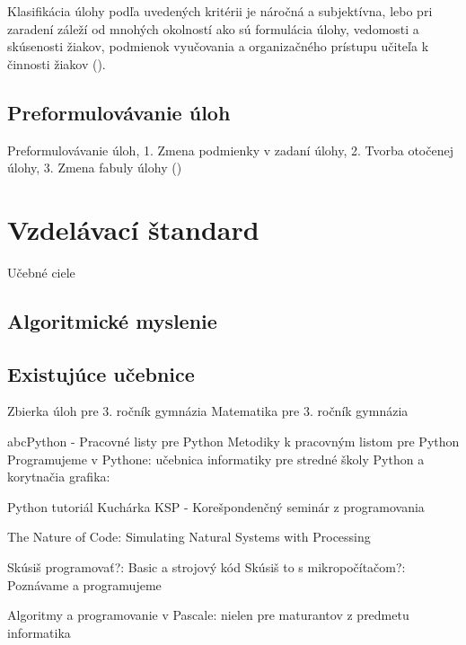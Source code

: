 Klasifikácia úlohy podľa uvedených kritérii je náročná a subjektívna, lebo pri zaradení záleží od mnohých okolností ako sú formulácia úlohy, vedomosti a skúsenosti žiakov, podmienok vyučovania a organizačného prístupu učiteľa k činnosti žiakov (\cite{mindakova_tvorba_2008}). 

\subsection{Preformulovávanie úloh}
Preformulovávanie úloh, 1. Zmena podmienky v zadaní úlohy, 2. Tvorba otočenej úlohy, 3. Zmena fabuly úlohy (\cite{mindakova_tvorba_2008})


\section{Vzdelávací štandard}
Učebné ciele \cite{noauthor_statny_2023} \cite{noauthor_statny_2023-1}

\subsection{Algoritmické myslenie}

\subsection{Existujúce učebnice}
Zbierka úloh pre 3. ročník gymnázia \cite{busek_zbierka_1987}
Matematika pre 3. ročník gymnázia \cite{sedivy_matematika_1986}

{abcPython} - {Pracovné} listy pre {Python} \cite{blaho_abcpython_2019}
Metodiky k pracovným listom pre {Python} \cite{blaho_metodiky_2019}
Programujeme v {Pythone}: učebnica informatiky pre stredné školy \cite{kucera_programujeme_2016}
Python a korytnačia grafika: \cite{meszarosova_python_2017}

Python tutoriál \cite{korman_python_2020}
Kuchárka {KSP} - {Korešpondenčný} seminár z programovania \cite{noauthor_kucharka_2022}

The {Nature} of {Code}: {Simulating} {Natural} {Systems} with {Processing} \cite{shiffman_nature_2012}

Skúsiš programovať?: {Basic} a strojový kód \cite{wattsova_skusis_1991}
Skúsiš to s mikropočítačom?: {Poznávame} a programujeme \cite{tatchellova_skusis_1990}

Algoritmy a programovanie v {Pascale}: nielen pre maturantov z predmetu informatika \cite{hedvigova_algoritmy_2020}


